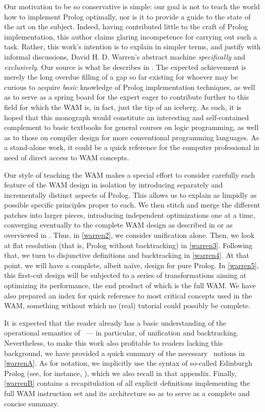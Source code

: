 Our motivation to be so conservative is simple: our goal is not to teach the
world how to implement Prolog optimally, nor is it to provide a guide to the
state of the art on the subject. Indeed, having contributed little to the craft
of Prolog implementation, this author claims glaring incompetence for carrying
out such a task. Rather, this work’s intention is to explain in simpler terms,
and justify with informal discussions, David H. D. Warren’s abstract machine
\emph{specifically} and \emph{exclusively}. Our source is what he describes in
\cite{War83, War88}. The expected achievement is merely the long overdue filling
of a gap so far existing for whoever may be curious to acquire \emph{basic}
knowledge of Prolog implementation techniques, as well as to serve as a spring
board for the expert eager to contribute further to this field for which the WAM
is, in fact, just the tip of an iceberg. As such, it is hoped that this
monograph would constitute an interesting and self-contained complement to basic
textbooks for general courses on logic programming, as well as to those on
compiler design for more conventional programming languages. As a stand-alone
work, it could be a quick reference for the computer professional in need of
direct access to WAM concepts.


Our style of teaching the WAM makes a special effort to consider carefully each
feature of the WAM design in isolation by introducing separately and
incrementally distinct aspects of Prolog. This allows us to explain as limpidly
as possible specific principles proper to each. We then stitch and merge the
different patches into larger pieces, introducing independent optimizations one
at a time, converging eventually to the complete WAM design as described in
\cite{War83} or as overviewed in \cite{War88}. Thus, in \ref{warren2}, we
consider unification alone. Then, we look at flat resolution (that is, Prolog
without backtracking) in \ref{warren3}. Following that, we turn to disjunctive
definitions and backtracking in \ref{warren4}. At that point, we will have a
complete, albeit na\"ive, design for pure Prolog. In \ref{warren5}, this
first-cut design will be subjected to a series of transformations aiming at
optimizing its performance, the end product of which is the full WAM. We have
also prepared an index for quick reference to most critical concepts used in the
WAM, something without which no (real) tutorial could possibly be complete.

It is expected that the reader already has a basic understanding of the
operational semantics of \prolog\ --- in particular, of unification and
backtracking. Nevertheless, to make this work also profitable to readers lacking
this background, we have provided a quick summary of the necessary \prolog\
notions in \ref{warrenA}. As for notation, we implicitly use the syntax of
so-called Edinburgh Prolog (see, for instance, \cite{CM84}), which we also
recall in that appendix. Finally, \ref{warrenB} contains a recapitulation of all
explicit definitions implementing the full WAM instruction set and its
architecture so as to serve as a complete and concise summary.

\secup
\secup